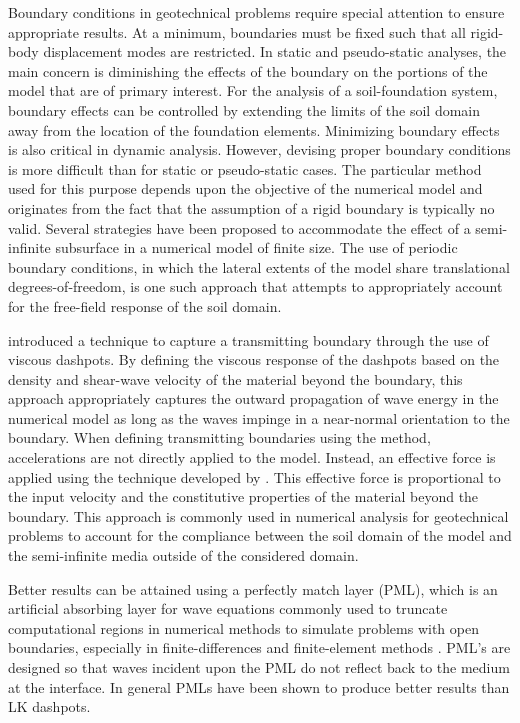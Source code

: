 Boundary conditions in geotechnical problems require special attention to ensure appropriate results. At a minimum, boundaries must be fixed such that all rigid-body displacement modes are restricted. In static and pseudo-static analyses, the main concern is diminishing the effects of the boundary on the portions of the model that are of primary interest. For the analysis of a soil-foundation system, boundary effects can be controlled by extending the limits of the soil domain away from the location of the foundation elements. Minimizing boundary effects is also critical in dynamic analysis. However, devising proper boundary conditions is more difficult than for static or pseudo-static cases. The particular method used for this purpose depends upon the objective of the numerical model and originates from the fact that the assumption of a rigid boundary is typically no valid. Several strategies have been proposed to accommodate the effect of a semi-infinite subsurface in a numerical model of finite size. The use of periodic boundary conditions, in which the lateral extents of the model share translational degrees-of-freedom, is one such approach that attempts to appropriately account for the free-field response of the soil domain. 

\cite{Lysmer69} introduced a technique to capture a transmitting boundary through the use of viscous dashpots. By defining the viscous response of the dashpots based on the density and shear-wave velocity of the material beyond the boundary, this approach appropriately captures the outward propagation of wave energy in the numerical model as long as the waves impinge in a near-normal orientation to the boundary. When defining transmitting boundaries using the \cite{Lysmer69} method, accelerations are not directly applied to the model. Instead, an effective force is applied using the technique developed by \cite{Joyner75}. This effective force is proportional to the input velocity and the constitutive properties of the material beyond the boundary. This approach is commonly used in numerical analysis for geotechnical problems to account for the compliance between the soil domain of the model and the semi-infinite media outside of the considered domain.

Better results can be attained using a perfectly match layer (PML), which is an artificial absorbing layer for wave equations commonly used to truncate computational regions in numerical methods to simulate problems with open boundaries, especially in finite-differences and finite-element methods \citep{Zhang19}. PML's are designed so that waves incident upon the PML do not reflect back to the medium at the interface. In general PMLs have been shown to produce better results than LK dashpots.

